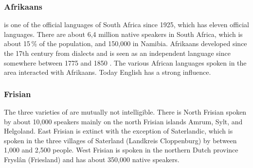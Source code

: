 
\subsubsection{Afrikaans}

 is one of the official languages of South Africa since 1925, which has eleven official languages.
There are about 6,4 million native speakers in South Africa, which is about 15\,\% of the population,
and 150,000 in Namibia. Afrikaans developed since the 17th century from  dialects and is seen
as an independent language since somewhere between 1775 and 1850 \citep{denBesten2012a-u}.\addpages
The various African languages spoken in the area interacted with Afrikaans.
Today English has a strong influence.



\subsubsection{Frisian}

The three varieties of  are mutually not intelligible. There is North Frisian spoken by
about 10,000 speakers mainly on the north Frisian islands Amrum, Sylt, and Helgoland. East Frisian
is extinct with the exception of Saterlandic, which is spoken in the three villages of Saterland
(Landkreis Cloppenburg) by between 1,000 and 2,500 people.
West Frisian is spoken in the northern Dutch province Fryslân (Friesland) and has about 350,000
native speakers.



